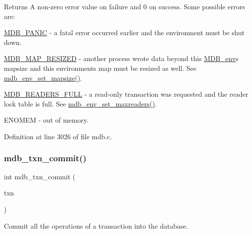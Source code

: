 \begin{DoxyReturn}{Returns}
A non-\/zero error value on failure and 0 on success. Some possible errors are\+: 
\begin{DoxyItemize}
\item \mbox{\hyperlink{group__errors_gae37b9aedcb3767faba3de8c1cf6d3473}{M\+D\+B\+\_\+\+P\+A\+N\+IC}} -\/ a fatal error occurred earlier and the environment must be shut down. 
\item \mbox{\hyperlink{group__errors_ga75c014faa4f02ffd234a5ee0e14baa92}{M\+D\+B\+\_\+\+M\+A\+P\+\_\+\+R\+E\+S\+I\+Z\+ED}} -\/ another process wrote data beyond this \mbox{\hyperlink{struct_m_d_b__env}{M\+D\+B\+\_\+env}}\textquotesingle{}s mapsize and this environment\textquotesingle{}s map must be resized as well. See \mbox{\hyperlink{group__mdb_ga4c47a5830f1071e578eaa1bbda2ae83e}{mdb\+\_\+env\+\_\+set\+\_\+mapsize()}}. 
\item \mbox{\hyperlink{group__errors_gadd6aaa88823710b97cc44f4f8c160799}{M\+D\+B\+\_\+\+R\+E\+A\+D\+E\+R\+S\+\_\+\+F\+U\+LL}} -\/ a read-\/only transaction was requested and the reader lock table is full. See \mbox{\hyperlink{group__mdb_gae687966c24b790630be2a41573fe40e2}{mdb\+\_\+env\+\_\+set\+\_\+maxreaders()}}. 
\item E\+N\+O\+M\+EM -\/ out of memory. 
\end{DoxyItemize}
\end{DoxyReturn}


Definition at line 3026 of file mdb.\+c.

\mbox{\label{group__internal_ga846fbd6f46105617ac9f4d76476f6597}} 
\subsubsection{\texorpdfstring{mdb\+\_\+txn\+\_\+commit()}{mdb\_txn\_commit()}}
{\footnotesize\ttfamily int mdb\+\_\+txn\+\_\+commit (\begin{DoxyParamCaption}\item[{\mbox{\hyperlink{struct_m_d_b__txn}{M\+D\+B\+\_\+txn}} $\ast$}]{txn }\end{DoxyParamCaption})}



Commit all the operations of a transaction into the database. 

